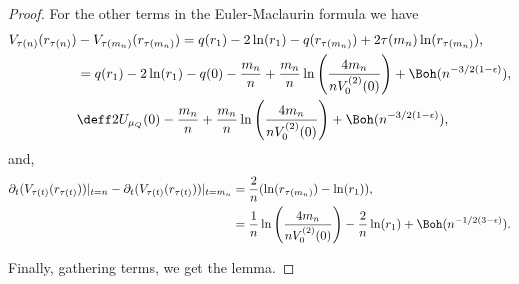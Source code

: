 \begin{proof}
For the other terms in the Euler-Maclaurin formula we have
\begin{align}
	V_{\tau(n)}(r_{\tau(n)})  &- V_{\tau{(m_n)}}(r_{\tau(m_n)}) = q(r_1) - 2 \ln(r_1) - q(r_{\tau(m_n)}) + 2 \tau(m_n) \ln(r_{\tau(m_n)}), \\
	& = q(r_1) - 2 \ln(r_1) - q(0) - \frac{m_n}{n} + \frac{m_n}{n} \ln{\left(\frac{4 m_n}{n V^{(2)}_0(0)}\right)} + \Boh(n^{-3/2(1-\epsilon)}), \\
	& \deff 2 U_{\mu_Q}(0) - \frac{m_n}{n} + \frac{m_n}{n} \ln{\left(\frac{4 m_n}{n V^{(2)}_0(0)}\right)} + \Boh(n^{-3/2(1-\epsilon)}),
\end{align}
and,
\begin{align}
		\partial_t (V_{\tau(t)}(r_{\tau(t)})) |_{t=n} - \partial_t (V_{\tau(t)}(r_{\tau(t)})) |_{t=m_n} & = \frac{2}{n}(\ln(r_{\tau(m_n)}) - \ln(r_1)), \\
		& = \frac{1}{n} \ln{\left(\frac{4 m_n}{n V^{(2)}_0(0)}\right)}  - \frac{2}{n} \ln(r_1) + \Boh(n^{-1/2(3-\epsilon)}).
\end{align}

Finally, gathering terms, we get the lemma.
\end{proof}

